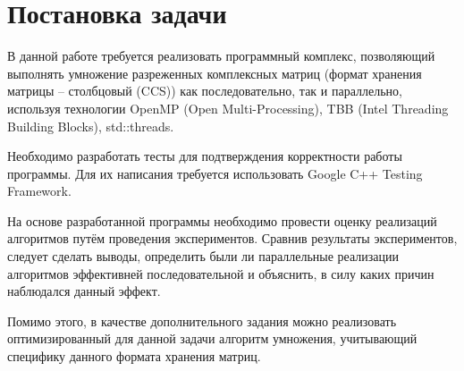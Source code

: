 \documentclass{report}
\begin{document}
	\section*{Постановка задачи}
		\par В данной работе требуется реализовать программный комплекс, позволяющий выполнять умножение разреженных комплексных матриц (формат хранения матрицы – столбцовый (CCS)) как последовательно, так и параллельно, используя технологии OpenMP (Open Multi-Processing), TBB (Intel Threading Building Blocks), std::threads.
		\par Необходимо разработать тесты для подтверждения корректности работы программы. Для их написания требуется использовать Google C++ Testing Framework.
		\par На основе разработанной программы необходимо провести оценку реализаций алгоритмов путём проведения экспериментов. Сравнив результаты экспериментов, следует сделать выводы, определить были ли параллельные реализации алгоритмов эффективней последовательной и объяснить, в силу каких причин наблюдался данный эффект.
		\par Помимо этого, в качестве дополнительного задания можно реализовать оптимизированный для данной задачи алгоритм умножения, учитывающий специфику данного формата хранения матриц. 
	\newpage


\end{document}
